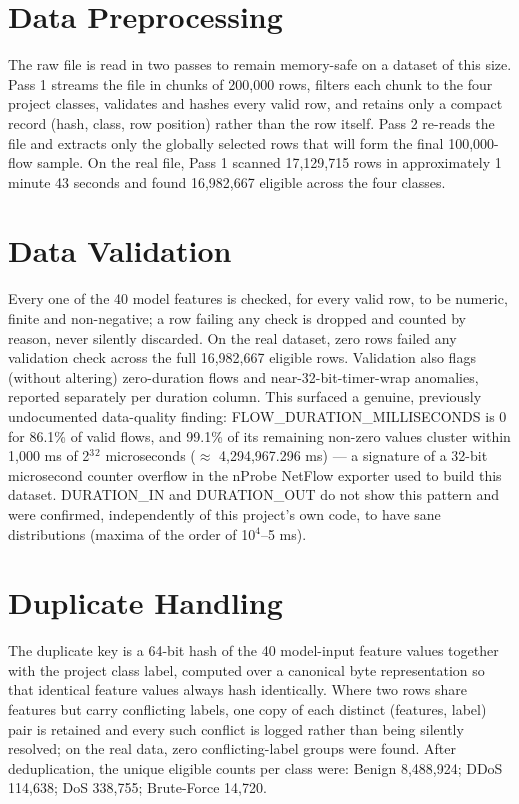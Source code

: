 \documentclass[12pt,a4paper]{report}
\begin{document}
\section{Data Preprocessing}
The raw file is read in two passes to remain memory-safe on a dataset of this size. Pass 1 streams the file in chunks of 200,000 rows, filters each chunk to the four project classes, validates and hashes every valid row, and retains only a compact record (hash, class, row position) rather than the row itself. Pass 2 re-reads the file and extracts only the globally selected rows that will form the final 100,000-flow sample. On the real file, Pass 1 scanned 17,129,715 rows in approximately 1 minute 43 seconds and found 16,982,667 eligible across the four classes.

\section{Data Validation}
Every one of the 40 model features is checked, for every valid row, to be numeric, finite and non-negative; a row failing any check is dropped and counted by reason, never silently discarded. On the real dataset, zero rows failed any validation check across the full 16,982,667 eligible rows. Validation also flags (without altering) zero-duration flows and near-32-bit-timer-wrap anomalies, reported separately per duration column. This surfaced a genuine, previously undocumented data-quality finding: FLOW\_DURATION\_MILLISECONDS is 0 for 86.1\% of valid flows, and 99.1\% of its remaining non-zero values cluster within 1,000 ms of 2$^3$$^2$ microseconds ($\approx$ 4,294,967.296 ms) --- a signature of a 32-bit microsecond counter overflow in the nProbe NetFlow exporter used to build this dataset. DURATION\_IN and DURATION\_OUT do not show this pattern and were confirmed, independently of this project's own code, to have sane distributions (maxima of the order of 10$^4$--5 ms).

\section{Duplicate Handling}
The duplicate key is a 64-bit hash of the 40 model-input feature values together with the project class label, computed over a canonical byte representation so that identical feature values always hash identically. Where two rows share features but carry conflicting labels, one copy of each distinct (features, label) pair is retained and every such conflict is logged rather than being silently resolved; on the real data, zero conflicting-label groups were found. After deduplication, the unique eligible counts per class were: Benign 8,488,924; DDoS 114,638; DoS 338,755; Brute-Force 14,720.
\end{document}
